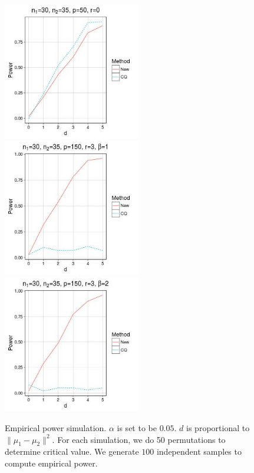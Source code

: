 \documentclass[review]{elsarticle}
\theoremstyle{plain}
\theoremstyle{definition}
\theoremstyle{remark}
\begin{document}
\begin{figure}
    \includegraphics[height=6cm]{code/fig4.jpeg}
    \\
    \includegraphics[height=6cm]{code/fig5.jpeg}
    \includegraphics[height=6cm]{code/fig6.jpeg}
    \caption{Empirical power simulation. $\alpha$ is set to be $0.05$. $d$ is proportional to $\|\mu_1-\mu_2\|^2$. For each simulation, we do 50 permutations to determine critical value. We generate $100$ independent samples to compute empirical power. }\label{fig:fig2}
\end{figure}


\end{document}
